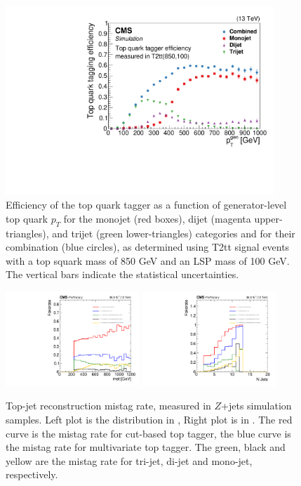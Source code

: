 \begin{figure}[htbp]
 \begin{center}
  \includegraphics[width=0.90\textwidth]{sections/mc4/TopTagger/figures/Tagger_Paper.pdf}
 \end{center}
 \caption{Efficiency of the top quark tagger as a function of generator-level top quark $p_{T}$ for
the monojet (red boxes), dijet (magenta upper-triangles), and trijet (green lower-triangles) categories
and for their combination (blue circles), as determined using T2tt signal events with a
top squark mass of 850 GeV and an LSP mass of 100 GeV. The vertical bars indicate the statistical
uncertainties.}
 \label{fig:c4ttefftight}
\end{figure}

\begin{figure}[htbp]
 \begin{center}
  \includegraphics[width=0.45\textwidth]{sections/mc4/TopTagger/figures/baseline_fakerate_met_tight.pdf}
  \includegraphics[width=0.45\textwidth]{sections/mc4/TopTagger/figures/baseline_fakerate_njet_tight.pdf}
 \end{center} \caption{Top-jet reconstruction mistag rate, measured in $Z$+jets simulation samples. Left plot is the distribution in \MET, Right plot is in \njets. The red curve is the mistag rate for cut-based top tagger, the blue curve is the mistag rate for multivariate top tagger. The green, black and yellow are the mistag rate for tri-jet, di-jet and mono-jet, respectively.}
 \label{fig:c4ttmistagtight}
\end{figure}
